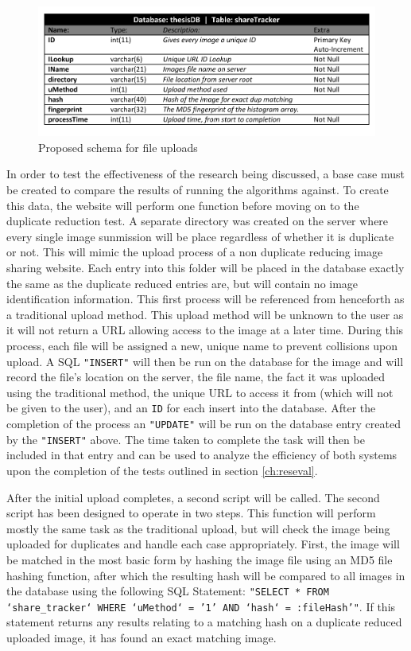 \begin{figure}[htbp]
\centering
\includegraphics[width=6in]{schema}
\caption{Proposed schema for file uploads}
\label{fig:schema}
\end{figure}

In order to test the effectiveness of the research being discussed, a base case must be created to compare the results of running the algorithms against. To create this data, the website will perform one function before moving on to the duplicate reduction test. A separate directory was created on the server where every single image sunmission will be place regardless of whether it is duplicate or not. This will mimic the upload process of a non duplicate reducing image sharing website. Each entry into this folder will be placed in the database exactly the same as the duplicate reduced entries are, but will contain no image identification information. This first process will be referenced from henceforth as a traditional upload method. This upload method will be unknown to the user as it will not return a URL allowing access to the image at a later time. During this process, each file will be assigned a new, unique name to prevent collisions upon upload. A SQL {\tt "INSERT"} will then be run on the database for the image and will record the file's location on the server, the file name, the fact it was uploaded using the traditional method, the unique URL to access it from (which will not be given to the user), and an {\tt ID} for each insert into the database. After the completion of the process an {\tt "UPDATE"} will be run on the database entry created by the {\tt "INSERT"} above. The time taken to complete the task will then be included in that entry and can be used to analyze the efficiency of both systems upon the completion of the tests outlined in section \ref{ch:reseval}.

After the initial upload completes, a second script will be called. The second script has been designed to operate in two steps. This function will perform mostly the same task as the traditional upload, but will check the image being uploaded for duplicates and handle each case appropriately. First, the image will be matched in the most basic form by hashing the image file using an MD5 file hashing function, after which the resulting hash will be compared to all images in the database using the following SQL Statement: {\tt "SELECT * FROM `share\_tracker` WHERE `uMethod` = '1' AND `hash` = :fileHash'"}. If this statement returns any results relating to a matching hash on a duplicate reduced uploaded image, it has found an exact matching image. 


